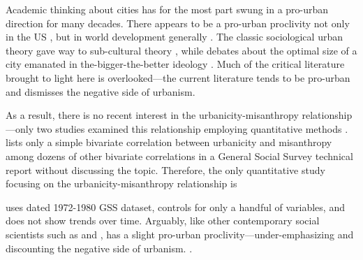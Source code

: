 \documentclass[11pt, letterpaper]{article}
\begin{document}
\begin{spacing}{1.4}
Academic thinking about cities has for the most part swung in a pro-urban
direction for many decades. There appears to be a pro-urban proclivity not only in the US \citep{hansonCityJournalautumn15}, but in world development generally \citep{lipton77}. The classic sociological urban theory \citep{wirth38,milgram70,park15,park84,simmel03,tonnies57} gave way to
  sub-cultural theory \citep{fischer75,fischer95,wilson85, palisi83}, while debates about the optimal size of a city \citep{richardson72,singell74,alonso60,alonso71,elgin75,capello00} emanated in the-bigger-the-better ideology \citep{glaeser11}. 
%
  Much of the critical literature brought to light here is overlooked---the current
literature tends to be pro-urban and dismisses the negative side of urbanism.
  
As a result, there is no recent interest in the urbanicity-misanthropy relationship---only two studies examined this relationship employing quantitative methods \citep{wilson85,smith97}. \citet{smith97} lists only a simple bivariate correlation between urbanicity and misanthropy among dozens of other bivariate correlations in a General Social Survey technical report without discussing the topic. 
Therefore, the only quantitative study focusing on the urbanicity-misanthropy relationship is \citet{wilson85}%


\citet{wilson85} uses dated 1972-1980 GSS dataset, controls for only a handful
of variables, and does not show trends over time.  Arguably, like other
contemporary social scientists such as \citet[][]{veenhoven94,meyer13} and
\citet[][]{fischer82}, \citeauthor{wilson85} has a slight pro-urban
proclivity---under-emphasizing and discounting the negative side of urbanism. . 


\end{spacing}
\end{document}
